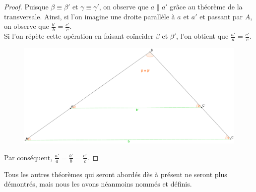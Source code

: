 \documentclass[a4paper,12pt]{article}
\begin{document}
\begin{proof}
Puisque $\beta \equiv \beta '$ et $\gamma \equiv \gamma '$, on observe que $a \parallel a'$ grâce au théorème de la transversale.
Ainsi, si l'on imagine une droite parallèle à $a$ et $a'$ et passant par $A$, on observe que $\frac{b'}{b} = \frac{c'}{c}$.\\
Si l'on répète cette opération en faisant coïncider $\beta$ et $\beta '$, l'on obtient que $\frac{a'}{a} = \frac{c'}{c}$.
\begin{figure}[H]
        \centering
        \includegraphics[scale=0.15]{similitude1-2.eps}
    \end{figure}
    
Par conséquent, $\frac{a'}{a} = \frac{b'}{b} = \frac{c'}{c}$.
\end{proof}


\begin{remark}
Tous les autres théorèmes qui seront abordés dès à présent ne seront plus démontrés, mais nous les avons néanmoins nommés et définis.
\end{remark}
\end{document}
